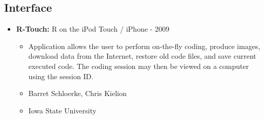 \documentclass[oneside]{article}
\begin{document}
  \subsection{Interface}
    \begin{itemize}
      \item{\bf R-Touch:}  R on the iPod Touch / iPhone - 2009
      \begin{itemize}
        \item Application allows the user to perform on-the-fly coding, produce images, download data from the Internet, restore old code files, and save current executed code.  The coding session may then be viewed on a computer using the session ID.
        \item Barret Schloerke, Chris Kielion
        \item Iowa State University
      \end{itemize}


    \end{itemize}



\end{document}

